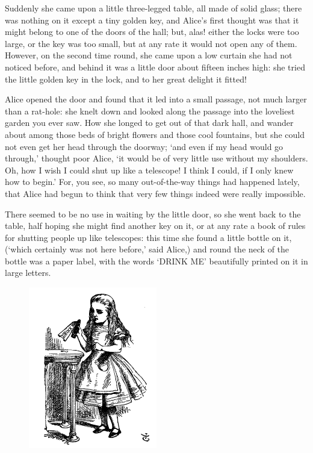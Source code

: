 \documentclass[12pt,openany]{memoir}
\begin{document}
Suddenly she came upon a little three-legged table, all made of solid glass; there was nothing on it except a tiny golden key, and Alice's first thought was that it might belong to one of the doors of the hall; but, alas! either the locks were too large, or the key was too small, but at any rate it would not open any of them. However, on the second time round, she came upon a low curtain she had not noticed before, and behind it was a little door about fifteen inches high: she tried the little golden key in the lock, and to her great delight it fitted!

Alice opened the door and found that it led into a small passage, not much larger than a rat-hole: she knelt down and looked along the passage into the loveliest garden you ever saw. How she longed to get out of that dark hall, and wander about among those beds of bright flowers and those cool fountains, but she could not even get her head through the doorway; `and even if my head would go through,' thought poor Alice, `it would be of very little use without my shoulders. Oh, how I wish I could shut up like a telescope! I think I could, if I only knew how to begin.' For, you see, so many out-of-the-way things had happened lately, that Alice had begun to think that very few things indeed were really impossible.

There seemed to be no use in waiting by the little door, so she went back to the table, half hoping she might find another key on it, or at any rate a book of rules for shutting people up like telescopes: this time she found a little bottle on it, (`which certainly was not here before,' said Alice,) and round the neck of the bottle was a paper label, with the words `DRINK ME' beautifully printed on it in large letters.

\begin{figure}
  \includegraphics[width=0.5\textwidth]{illustrations/pic_04.jpg}
\end{figure}
\end{document}
